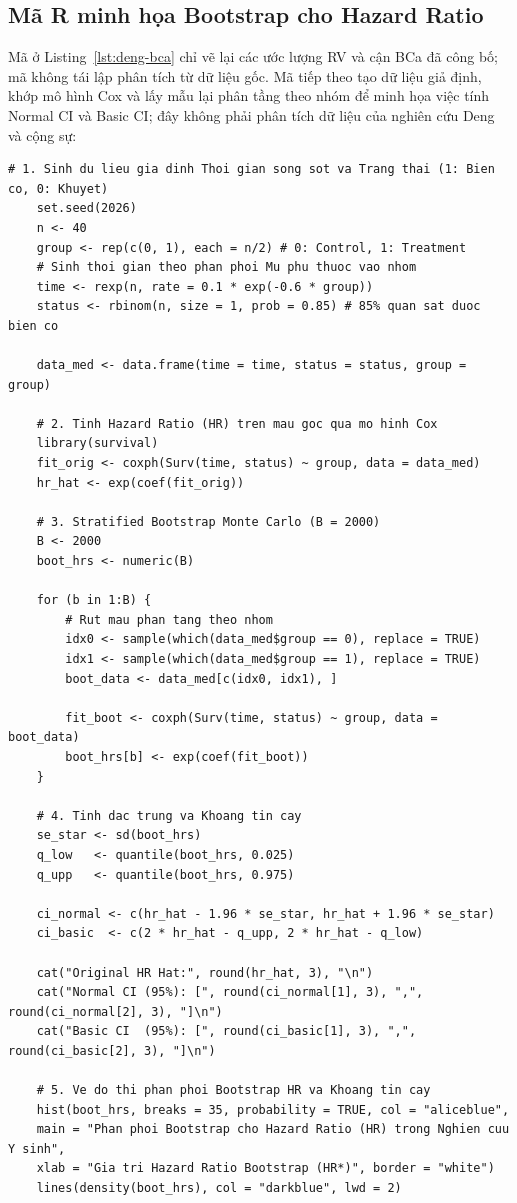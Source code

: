 \subsection{Mã R minh họa Bootstrap cho Hazard Ratio}

Mã ở Listing~\ref{lst:deng-bca} chỉ vẽ lại các ước lượng RV và cận BCa đã công bố; mã không tái lập phân tích từ dữ liệu gốc. Mã tiếp theo tạo dữ liệu giả định, khớp mô hình Cox và lấy mẫu lại phân tầng theo nhóm để minh họa việc tính Normal CI và Basic CI; đây không phải phân tích dữ liệu của nghiên cứu Deng và cộng sự:

\begin{lstlisting}[style=Rstyle, caption={Bootstrap HR}]
	# 1. Sinh du lieu gia dinh Thoi gian song sot va Trang thai (1: Bien co, 0: Khuyet)
	set.seed(2026)
	n <- 40
	group <- rep(c(0, 1), each = n/2) # 0: Control, 1: Treatment
	# Sinh thoi gian theo phan phoi Mu phu thuoc vao nhom
	time <- rexp(n, rate = 0.1 * exp(-0.6 * group))
	status <- rbinom(n, size = 1, prob = 0.85) # 85% quan sat duoc bien co
	
	data_med <- data.frame(time = time, status = status, group = group)
	
	# 2. Tinh Hazard Ratio (HR) tren mau goc qua mo hinh Cox
	library(survival)
	fit_orig <- coxph(Surv(time, status) ~ group, data = data_med)
	hr_hat <- exp(coef(fit_orig))
	
	# 3. Stratified Bootstrap Monte Carlo (B = 2000)
	B <- 2000
	boot_hrs <- numeric(B)
	
	for (b in 1:B) {
		# Rut mau phan tang theo nhom
		idx0 <- sample(which(data_med$group == 0), replace = TRUE)
		idx1 <- sample(which(data_med$group == 1), replace = TRUE)
		boot_data <- data_med[c(idx0, idx1), ]
		
		fit_boot <- coxph(Surv(time, status) ~ group, data = boot_data)
		boot_hrs[b] <- exp(coef(fit_boot))
	}
	
	# 4. Tinh dac trung va Khoang tin cay
	se_star <- sd(boot_hrs)
	q_low   <- quantile(boot_hrs, 0.025)
	q_upp   <- quantile(boot_hrs, 0.975)
	
	ci_normal <- c(hr_hat - 1.96 * se_star, hr_hat + 1.96 * se_star)
	ci_basic  <- c(2 * hr_hat - q_upp, 2 * hr_hat - q_low)
	
	cat("Original HR Hat:", round(hr_hat, 3), "\n")
	cat("Normal CI (95%): [", round(ci_normal[1], 3), ",", round(ci_normal[2], 3), "]\n")
	cat("Basic CI  (95%): [", round(ci_basic[1], 3), ",", round(ci_basic[2], 3), "]\n")
	
	# 5. Ve do thi phan phoi Bootstrap HR va Khoang tin cay
	hist(boot_hrs, breaks = 35, probability = TRUE, col = "aliceblue",
	main = "Phan phoi Bootstrap cho Hazard Ratio (HR) trong Nghien cuu Y sinh",
	xlab = "Gia tri Hazard Ratio Bootstrap (HR*)", border = "white")
	lines(density(boot_hrs), col = "darkblue", lwd = 2)
	

\end{lstlisting}
